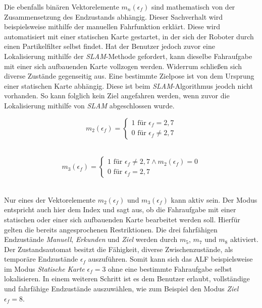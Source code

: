 		Die ebenfalls binären Vektorelemente $m_n(\epsilon_f)$ sind mathematisch von der Zusammensetzung des Endzustands abhängig. Dieser Sachverhalt wird beispielsweise mithilfe der manuellen Fahrfunktion erklärt. Diese wird automatisiert mit einer statischen Karte gestartet, in der sich der Roboter durch einen Partikelfilter selbst findet. Hat der Benutzer jedoch zuvor eine Lokalisierung mithilfe der \textit{SLAM}-Methode gefordert, kann dieselbe Fahraufgabe mit einer sich aufbauenden Karte vollzogen werden. Widerrum schließen sich diverse Zustände gegenseitig aus. Eine bestimmte Zielpose ist von dem Ursprung einer statischen Karte abhängig. Diese ist beim \textit{SLAM}-Algorithmus jeodch nicht vorhanden. So kann folglich kein Ziel angefahren werden, wenn zuvor die Lokalisierung mithilfe von \textit{SLAM} abgeschlossen wurde.\\
		
		\begin{figure}[H]
			\centering
			\begin{minipage}[b]{0.4\textwidth}
				\begin{equation}
					m_2(\epsilon_f)=\left\{\begin{array}{ll} 1 \text{ für } \epsilon_f=2,7 \\
					0 \text{ für }\epsilon_f\neq 2,7\end{array}\right. 
					\label{eq: m2}
				\end{equation}\\
			\end{minipage}
			\hfill
			\begin{minipage}[b]{0.55\textwidth}
				\begin{equation}
					m_3(\epsilon_f)=\left\{\begin{array}{ll} 1 \text{ für } \epsilon_f\neq2,7 \wedge m_2(\epsilon_f) = 0 \\
					0 \text{ für }\epsilon_f= 2,7\end{array}\right.
					\label{eq: m3}
				\end{equation}\\
			\end{minipage}
		\end{figure}
		
		Nur eines der Vektorelemente $m_2(\epsilon_f)$ und $m_3(\epsilon_f)$ kann aktiv sein. Der Modus entspricht auch hier dem Index und sagt aus, ob die Fahraufgabe mit einer statischen oder einer sich aufbauenden Karte bearbeitet werden soll. Hierfür gelten die bereits angesprochenen Restriktionen. Die drei fahrfähigen Endzustände \textit{Manuell}, \textit{Erkunden} und \textit{Ziel} werden durch $m_5$, $m_7$ und $m_8$ aktiviert. Der Zustandsautomat besitzt die Fähigkeit, diverse Zwischenzustände, als temporäre Endzustände $\epsilon_f$ auszuführen. Somit kann sich das ALF beispielsweise im Modus \textit{Statische Karte} $\epsilon_f=3$ ohne eine bestimmte Fahraufgabe selbst lokalisieren. In einem weiteren Schritt ist es dem Benutzer erlaubt, vollständige und fahrfähige Endzustände auszuwählen, wie zum Beispiel den Modus \textit{Ziel} $\epsilon_f=8$.\\
		
